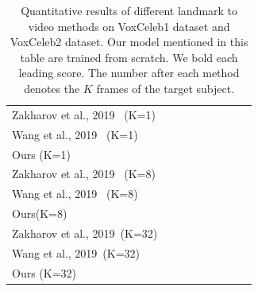 \documentclass[runningheads]{llncs}
\begin{document}
\begin{table}[t]
\begin{tabular*}{0.98\linewidth}{  l | c c  c c| c c c c }
 {{\scriptsize{Zakharov et al., 2019~\cite{zakharov2019few} (K=1)}}} & {      } &{       } &{      } &     &     &         \\ %
  {{\scriptsize{Wang et al., 2019~\cite{wang2018fewshotvid2vid} (K=1)}}} & { } &{ } &{ } & & &  & {} &{}\\ %
 {{\scriptsize{Ours (K=1)} }}&\bf{   } & \bf{     } &{     } & \bf{      } & \bf{      } &\bf{      }  \\ 
 \hline
 {{\scriptsize{Zakharov et al., 2019~\cite{zakharov2019few} (K=8)}}} & {      } &{       } &{      } &     &     &         \\ %
  {{\scriptsize{Wang et al., 2019~\cite{wang2018fewshotvid2vid} (K=8)}}} & { } &{ } &{ } & & &  & {} &{} \\ %
 {{\scriptsize{Ours(K=8)} }}&\bf{   } & \bf{     } &{     } & \bf{      } & \bf{      } &\bf{      }  \\
 \hline
 {{\scriptsize{Zakharov et al., 2019~\cite{zakharov2019few}(K=32)}}} & {      } &{       } &{      } &     &     &         \\ %
  {{\scriptsize{Wang et al., 2019~\cite{wang2018fewshotvid2vid}(K=32)}}} & { } &{ } &{ } & & &  & {} &{}   \\ %
 {{\scriptsize{Ours (K=32)} }}&\bf{   } & \bf{     } &{     } & \bf{      } & \bf{      } &\bf{      }  \\ 
  \end{tabular*}
  \caption{Quantitative results of different landmark to video methods on VoxCeleb1 dataset and VoxCeleb2 dataset. Our model mentioned in this table are trained from scratch. We bold each leading score. The number after each method denotes the $K$ frames of the target subject.}
    \label{tab:lmark_tb}
\end{table}
  
\end{document}
